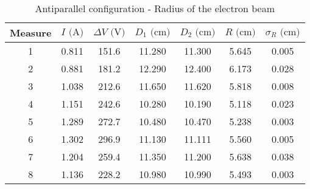 \begin{table}[!htbp]
    {\par\centering
    \begin{tabular}{ccccccc}
        \hline
        Measure & $I \text{ (A)}$ & $\Delta V \text{ (V)}$ & $D_1 \text{ (cm)}$ & $D_2 \text{ (cm)}$ & $R \text{ (cm)}$ & $\sigma_R \text{ (cm)}$ \\
        \hline
        1   &   0.811&   151.6&  11.280&  11.300& 5.645&  0.005\\
        2   &   0.881&   181.2&  12.290&  12.400& 6.173&  0.028\\
        3   &   1.038&   212.6&  11.650&  11.620& 5.818&  0.008\\
        4   &   1.151&   242.6&  10.280&  10.190& 5.118&  0.023\\
        5   &   1.289&   272.7&  10.480&  10.470& 5.238&  0.003\\
        6   &   1.302&   296.9&  11.130&  11.111& 5.560&  0.005\\
        7   &   1.204&   259.4&  11.350&  11.200& 5.638&  0.038\\
        8   &   1.136&   228.2&  10.980&  10.990& 5.493&  0.003\\
        \hline
    \end{tabular}
    \par}
    \caption{Antiparallel configuration - Radius of the electron beam}
\end{table}

